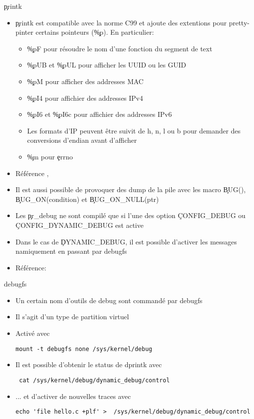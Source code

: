 \begin{frame}[fragile=singleslide]{\c{printk}}
  \begin{itemize} 
  \item  \c{printk} est  compatible avec  la norme  C99 et  ajoute des
   extentions  pour  pretty-pinter  certains pointeurs  (\c{\%p}).  En
   particulier:
     \begin{itemize}
    \item \c{\%pF}  pour résoudre le  nom d'une fonction du  segment de
      text
    \item \c{\%pUB} et \c{\%pUL} pour afficher les UUID ou les GUID
    \item \c{\%pM} pour afficher des addresses MAC
    \item \c{\%pI4} pour affichier des addresses IPv4
    \item \c{\%pI6} et \c{\%pI6c} pour affichier des addresses IPv6
    \item Les  formats d'IP peuvent être suivit  de h, n, l  ou b pour
      demander des conversions d'endian avant d'afficher
    \item \c{\%m} pour \c{errno}
    \end{itemize} 
  \item                Référence                ,
  \item Il  est aussi possible de  provoquer des dump de  la pile avec
    les macro \c{BUG()}, \c{BUG_ON(condition)} et \c{BUG_ON_NULL(ptr)}
  \item  Les \c{pr_debug}  ne sont  compilé  que si  l'une des  option
    \c{CONFIG_DEBUG} ou \c{CONFIG_DYNAMIC_DEBUG} est active
  \item Dans  le cas de  \c{DYNAMIC_DEBUG}, il est  possible d'activer
    les messages namiquement en passant par debugfs
  \item Référence: 
  \end{itemize} 
\end{frame} 

\begin{frame}[fragile=singleslide]{debugfs}
\begin{itemize} 
\item Un certain nom d'outils de debug sont commandé par debugfs
\item Il s'agit d'un type de partition virtuel
\item Activé avec 
\begin{lstlisting} 
mount -t debugfs none /sys/kernel/debug
\end{lstlisting} 
\item Il est possible d'obtenir le status de dprintk avec 
\begin{lstlisting} 
 cat /sys/kernel/debug/dynamic_debug/control
\end{lstlisting} 
\item ... et d'activer de nouvelles traces avec 
 \begin{lstlisting} 
echo 'file hello.c +plf' >  /sys/kernel/debug/dynamic_debug/control
\end{lstlisting} 
\end{itemize} 
\end{frame} 

